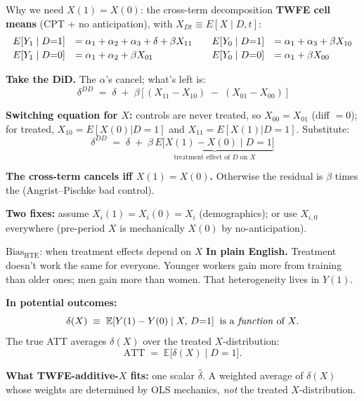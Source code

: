 \documentclass[aspectratio=169,11pt]{beamer}
\begin{document}
\begin{frame}{Why we need $X(1) = X(0)$: the cross-term decomposition}
\scriptsize
\textbf{TWFE cell means} (CPT + no anticipation), with $X_{Dt}\equiv E[X\mid D, t]$:
\[
\begin{array}{rl@{\qquad}rl}
E[Y_1\mid D{=}1] &= \alpha_1 + \alpha_2 + \alpha_3 + \delta + \beta X_{11} &
E[Y_0\mid D{=}1] &= \alpha_1 + \alpha_3 + \beta X_{10} \\[2pt]
E[Y_1\mid D{=}0] &= \alpha_1 + \alpha_2 + \beta X_{01} &
E[Y_0\mid D{=}0] &= \alpha_1 + \beta X_{00}
\end{array}
\]

\textbf{Take the DiD.} \;The $\alpha$'s cancel; what's left is:
\[
\delta^{DD} \;=\; \delta \;+\; \beta\,\big[\,(X_{11} - X_{10}) \;-\; (X_{01} - X_{00})\,\big]
\]

\textbf{Switching equation for $X$:} \;controls are never treated, so $X_{00} = X_{01}$ (diff $=0$); for treated, $X_{10} = E[X(0)|D{=}1]$ and $X_{11} = E[X(1)|D{=}1]$. \;Substitute:
\[
\delta^{DD} \;=\; \delta \;+\; \beta\,\underbrace{E\big[X(1) - X(0)\mid D{=}1\big]}_{\text{treatment effect of }D\text{ on }X}
\]

\textbf{The cross-term cancels iff $X(1) = X(0)$.} \;Otherwise the residual is $\beta$ times the  (Angrist--Pischke bad control).

\textbf{Two fixes:} \;assume $X_i(1) = X_i(0) = X_i$ (demographics); or use $X_{i,0}$ everywhere (pre-period $X$ is mechanically $X(0)$ by no-anticipation).
\end{frame}


\begin{frame}{$\text{Bias}_{\text{HTE}}$: when treatment effects depend on $X$}
\footnotesize
\textbf{In plain English.} \;Treatment doesn't work the same for everyone. \;Younger workers gain more from training than older ones; men gain more than women. \;That heterogeneity lives in $Y(1)$.

\vspace{0.5em}
\textbf{In potential outcomes:}
\[
\delta(X) \;\equiv\; \mathbb{E}[Y(1) - Y(0) \mid X,\,D{=}1] \;\;\text{is a \textit{function} of } X.
\]
The true ATT averages $\delta(X)$ over the treated $X$-distribution:
\[
\text{ATT} \;=\; \mathbb{E}\big[\delta(X) \mid D{=}1\big].
\]

\textbf{What TWFE-additive-$X$ fits:} \;one scalar $\hat{\delta}$. \;A weighted average of $\delta(X)$ whose weights are determined by OLS mechanics, \textit{not} the treated $X$-distribution.

\vspace{0.4em}
\end{frame}
\end{document}
